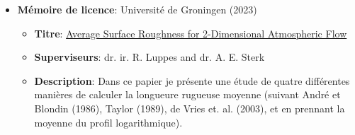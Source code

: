 \begin{itemize}
\begin{itemize}
    \end{itemize}
    \item \textbf{Mémoire de licence}: Université de Groningen (2023) \begin{itemize}
        \item \textbf{Titre}: \href{https://milenemdvl.github.io/CV/theses/BachelorThesis.pdf}{Average Surface Roughness for 2-Dimensional Atmospheric Flow}
        \item \textbf{Superviseurs}: dr. ir. R. Luppes and dr. A. E. Sterk 
        \item \textbf{Description}: Dans ce papier je présente une étude de quatre différentes manières de
        calculer la longueure rugueuse moyenne (suivant André et Blondin (1986), Taylor (1989), de Vries et. al. (2003), et en prennant la moyenne du profil logarithmique).
    \end{itemize}
\end{itemize}